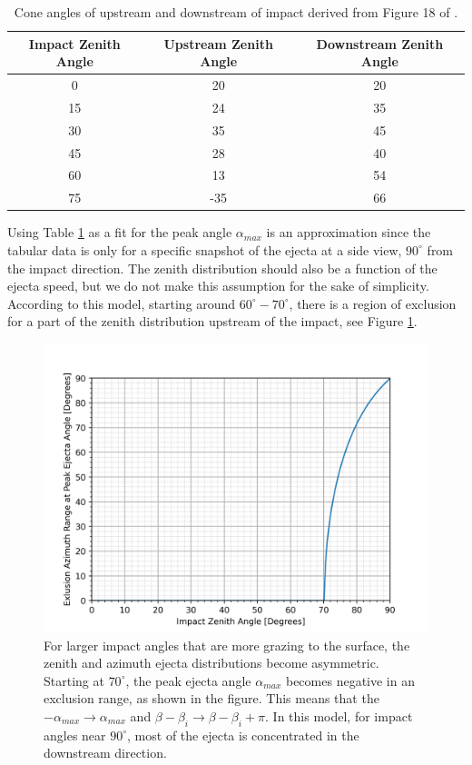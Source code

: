 \documentclass{hitec}
\numberwithin{equation}{section}
\begin{document}
\begin{table}[h]\centering
	\caption{Cone angles of upstream and downstream of impact derived from Figure 18 of \cite{gault1978experimental}.}\label{tab:upstream_downstream_angles}
	\begin{tabular}{|c | c | c |}\hline
		Impact Zenith Angle & Upstream Zenith Angle & Downstream Zenith Angle\\\hline
		0	&20	&20\\\hline
		15	&24	&35\\\hline
		30	&35	&45\\\hline
		45	&28	&40\\\hline
		60	&13	&54\\\hline
		75	&-35	&66\\\hline		
	\end{tabular}
\end{table}
Using Table \ref{tab:upstream_downstream_angles} as a fit for the peak angle $\alpha_{max}$ is an approximation since the tabular data is only for a specific snapshot of the ejecta at a side view, $90^\circ$ from the impact direction. The zenith distribution should also be a function of the ejecta speed, but we do not make this assumption for the sake of simplicity. According to this model, starting around $60^\circ - 70^\circ$, there is a region of exclusion for a part of the zenith distribution upstream of the impact, see Figure \ref{fig:ExlusionRange_vs_ImpactAngle}.


\begin{figure}[h!]
	\centering
	\includegraphics[scale=0.65]{ExlusionRange_vs_ImpactAngle.png}
	\caption{For larger impact angles that are more grazing to the surface, the zenith and azimuth ejecta distributions become asymmetric. Starting at $70^\circ$, the peak ejecta angle $\alpha_{max}$ becomes negative in an exclusion range, as shown in the figure. This means that the $-\alpha_{max}\to\alpha_{max}$ and $\beta-\beta_i\to \beta-\beta_i +\pi$. In this model, for impact angles near $90^\circ$, most of the ejecta is concentrated in the downstream direction.}\label{fig:ExlusionRange_vs_ImpactAngle}
\end{figure}
\end{document}
